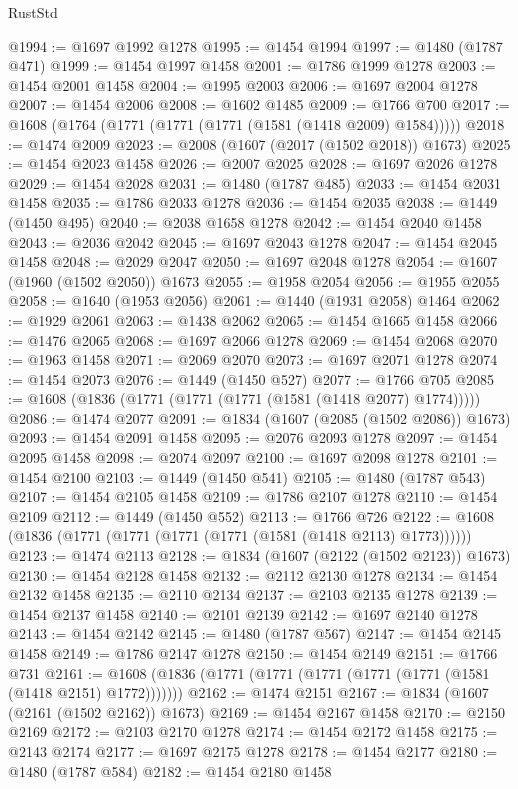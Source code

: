 \begin{lexlean}{RustStd}
\begin{coremodule}
@1994 := @1697 @1992 @1278
@1995 := @1454 @1994
@1997 := @1480 (@1787 @471)
@1999 := @1454 @1997 @1458
@2001 := @1786 @1999 @1278
@2003 := @1454 @2001 @1458
@2004 := @1995 @2003
@2006 := @1697 @2004 @1278
@2007 := @1454 @2006
@2008 := @1602 @1485
@2009 := @1766 @700
@2017 := @1608 (@1764 (@1771 (@1771 (@1771 (@1581 (@1418 @2009) @1584)))))
@2018 := @1474 @2009
@2023 := @2008 (@1607 (@2017 (@1502 @2018)) @1673)
@2025 := @1454 @2023 @1458
@2026 := @2007 @2025
@2028 := @1697 @2026 @1278
@2029 := @1454 @2028
@2031 := @1480 (@1787 @485)
@2033 := @1454 @2031 @1458
@2035 := @1786 @2033 @1278
@2036 := @1454 @2035
@2038 := @1449 (@1450 @495)
@2040 := @2038 @1658 @1278
@2042 := @1454 @2040 @1458
@2043 := @2036 @2042
@2045 := @1697 @2043 @1278
@2047 := @1454 @2045 @1458
@2048 := @2029 @2047
@2050 := @1697 @2048 @1278
@2054 := @1607 (@1960 (@1502 @2050)) @1673
@2055 := @1958 @2054
@2056 := @1955 @2055
@2058 := @1640 (@1953 @2056)
@2061 := @1440 (@1931 @2058) @1464
@2062 := @1929 @2061
@2063 := @1438 @2062
@2065 := @1454 @1665 @1458
@2066 := @1476 @2065
@2068 := @1697 @2066 @1278
@2069 := @1454 @2068
@2070 := @1963 @1458
@2071 := @2069 @2070
@2073 := @1697 @2071 @1278
@2074 := @1454 @2073
@2076 := @1449 (@1450 @527)
@2077 := @1766 @705
@2085 := @1608 (@1836 (@1771 (@1771 (@1771 (@1581 (@1418 @2077) @1774)))))
@2086 := @1474 @2077
@2091 := @1834 (@1607 (@2085 (@1502 @2086)) @1673)
@2093 := @1454 @2091 @1458
@2095 := @2076 @2093 @1278
@2097 := @1454 @2095 @1458
@2098 := @2074 @2097
@2100 := @1697 @2098 @1278
@2101 := @1454 @2100
@2103 := @1449 (@1450 @541)
@2105 := @1480 (@1787 @543)
@2107 := @1454 @2105 @1458
@2109 := @1786 @2107 @1278
@2110 := @1454 @2109
@2112 := @1449 (@1450 @552)
@2113 := @1766 @726
@2122 := @1608 (@1836 (@1771 (@1771 (@1771 (@1771 (@1581 (@1418 @2113) @1773))))))
@2123 := @1474 @2113
@2128 := @1834 (@1607 (@2122 (@1502 @2123)) @1673)
@2130 := @1454 @2128 @1458
@2132 := @2112 @2130 @1278
@2134 := @1454 @2132 @1458
@2135 := @2110 @2134
@2137 := @2103 @2135 @1278
@2139 := @1454 @2137 @1458
@2140 := @2101 @2139
@2142 := @1697 @2140 @1278
@2143 := @1454 @2142
@2145 := @1480 (@1787 @567)
@2147 := @1454 @2145 @1458
@2149 := @1786 @2147 @1278
@2150 := @1454 @2149
@2151 := @1766 @731
@2161 := @1608 (@1836 (@1771 (@1771 (@1771 (@1771 (@1771 (@1581 (@1418 @2151) @1772)))))))
@2162 := @1474 @2151
@2167 := @1834 (@1607 (@2161 (@1502 @2162)) @1673)
@2169 := @1454 @2167 @1458
@2170 := @2150 @2169
@2172 := @2103 @2170 @1278
@2174 := @1454 @2172 @1458
@2175 := @2143 @2174
@2177 := @1697 @2175 @1278
@2178 := @1454 @2177
@2180 := @1480 (@1787 @584)
@2182 := @1454 @2180 @1458

\end{coremodule}
\end{lexlean}
